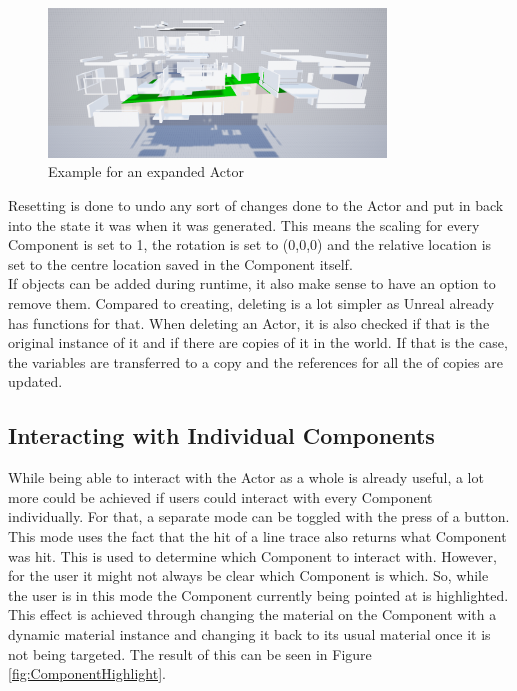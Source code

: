 \begin{figure}[htpb]
	\centering
	\includegraphics[width=0.8\textwidth]{fig/ExpanedActor.png}
	\caption[Example for an expanded Actor]{Example for an expanded Actor\protect}
	\label{fig:ExpanedActor}
\end{figure}

Resetting is done to undo any sort of changes done to the Actor and put in back into the state it was when it was generated. This means the scaling for every Component is set to 1, the rotation is set to (0,0,0) and the relative location is set to the centre location saved in the Component itself.\\
If objects can be added during runtime, it also make sense to have an option to remove them. Compared to creating, deleting is a lot simpler as Unreal already has functions for that. When deleting an Actor, it is also checked if that is the original instance of it and if there are copies of it in the world. If that is the case, the variables are transferred to a copy and the references for all the of copies are updated.\\

\subsection{Interacting with Individual Components}

While being able to interact with the Actor as a whole is already useful, a lot more could be achieved if users could interact with every Component individually. For that, a separate mode can be toggled with the press of a button. This mode uses the fact that the hit of a line trace also returns what Component was hit. This is used to determine which Component to interact with. However, for the user it might not always be clear which Component is which. So, while the user is in this mode the Component currently being pointed at is highlighted. This effect is achieved through changing the material on the Component with a dynamic material instance and changing it back to its usual material once it is not being targeted. The result of this can be seen in Figure \ref{fig:ComponentHighlight}.\\

